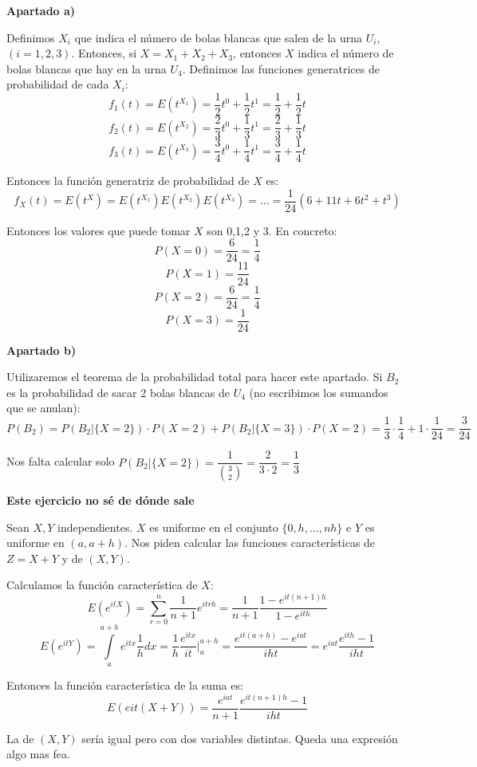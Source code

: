 \documentclass[openany]{book}
\begin{document}
\begin{exercise}
    $  $\\ 
    \begin{flushright}
        \textbf{Apartado a)}
    \end{flushright}
    
    Definimos $ X_i $ que indica el número de bolas blancas que salen de la urna $ U_i $, $ (i=1,2,3) $. Entonces, si $ X = X_1+X_2+X_3 $, entonces $ X $ indica el número de bolas blancas que hay en la urna $ U_4 $. Definimos las funciones generatrices de probabilidad de cada $ X_i $:
    $$ f_{1}(t) = E(t^{X_1}) = \dfrac{1}{2}t^{0} + \dfrac{1}{2}t^{1} = \dfrac{1}{2} +\dfrac{1}{2}t $$
    $$ f_{2}(t) = E(t^{X_2}) = \dfrac{2}{3}t^{0} + \dfrac{1}{3}t^{1} =\dfrac{2}{3} + \dfrac{1}{3}t$$
    $$ f_{3}(t) = E(t^{X_3}) = \dfrac{3}{4}t^{0} + \dfrac{1}{4}t^{1} = \dfrac{3}{4}+\dfrac{1}{4}t$$

    Entonces la función generatriz de probabilidad de $ X $ es:
    $$ f_{X}(t) = E(t^{X}) = E(t^{X_1})E(t^{X_2})E(t^{X_3}) = ... = \dfrac{1}{24}(6+11t+6t^2+t^3) $$
    
    Entonces los valores que puede tomar $ X $ son 0,1,2 y 3. En concreto:
    $$ P(X=0) = \dfrac{6}{24} = \dfrac{1}{4} $$
    $$ P(X=1) = \dfrac{11}{24} $$
    $$ P(X=2) = \dfrac{6}{24} = \dfrac{1}{4} $$
    $$ P(X=3) = \dfrac{1}{24} $$

\begin{flushright}
    \textbf{Apartado b)}
\end{flushright}

Utilizaremos el teorema de la probabilidad total para hacer este apartado. Si $ B_2 $ es la probabilidad de sacar 2 bolas blancas de $ U_4 $ (no escribimos los sumandos que se anulan):
$$ P(B_2) = P(B_2|\{X=2\}) \cdot P(X=2)+P(B_2|\{X=3\}) \cdot P(X=2) = \dfrac{1}{3}\cdot \dfrac{1}{4} + 1\cdot \dfrac{1}{24} = \dfrac{3}{24}$$

Nos falta calcular solo $ P(B_2|\{X=2\}) = \dfrac{1}{\binom{3}{2}} = \dfrac{2}{3\cdot 2} = \dfrac{1}{3} $

\end{exercise}

\begin{exercise}
    \textbf{Este ejercicio no sé de dónde sale}

    Sean $ X,Y $ independientes. $ X $ es uniforme en el conjunto $ \{0,h,...,nh\} $ e $ Y $ es uniforme en $ (a,a+h) $. Nos piden calcular las funciones características  de $ Z = X+Y $ y de $ (X,Y) $. 

    Calculamos la función característica de $ X $:
    $$ E(e^{itX}) = \sum\limits_{r=0}^{n}\dfrac{1}{n+1} e^{itrh} = \dfrac{1}{n+1} \dfrac{1-e^{it(n+1)h}}{1-e^{ith}} $$
    $$ E(e^{itY}) = \int\limits_{a}^{a+h} e^{itx}\dfrac{1}{h}dx = \dfrac{1}{h} \dfrac{e^{itx}}{it} \Biggr|_{a}^{a+h} = \dfrac{e^{it(a+h)}-e^{iat}}{iht} = e^{iat}\dfrac{e^{ith}-1}{iht} $$

    Entonces la función característica de la suma es:
    $$ E(eit(X+Y)) = \dfrac{e^{iat}}{n+1}\dfrac{e^{it(n+1)h}-1}{iht} $$

    La de $ (X,Y) $ sería igual pero con dos variables distintas. Queda una expresión algo mas fea.
\end{exercise}
\end{document}
